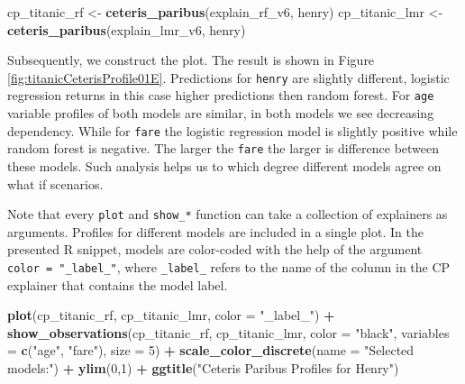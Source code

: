 \documentclass[12pt,]{krantz}
\newenvironment{Shaded}{\begin{snugshade}}{\end{snugshade}}
\newcommand{\DataTypeTok}[1]{\textcolor[rgb]{0.13,0.29,0.53}{#1}}
\newcommand{\DecValTok}[1]{\textcolor[rgb]{0.00,0.00,0.81}{#1}}
\newcommand{\KeywordTok}[1]{\textcolor[rgb]{0.13,0.29,0.53}{\textbf{#1}}}
\newcommand{\NormalTok}[1]{#1}
\newcommand{\OperatorTok}[1]{\textcolor[rgb]{0.81,0.36,0.00}{\textbf{#1}}}
\newcommand{\StringTok}[1]{\textcolor[rgb]{0.31,0.60,0.02}{#1}}
\begin{document}
\begin{Shaded}
\begin{Highlighting}[]
\NormalTok{cp_titanic_rf <-}\StringTok{ }\KeywordTok{ceteris_paribus}\NormalTok{(explain_rf_v6, henry)}
\NormalTok{cp_titanic_lmr <-}\StringTok{ }\KeywordTok{ceteris_paribus}\NormalTok{(explain_lmr_v6, henry)}
\end{Highlighting}
\end{Shaded}

Subsequently, we construct the plot. The result is shown in Figure \ref{fig:titanicCeterisProfile01E}. Predictions for \texttt{henry} are slightly different, logistic regression returns in this case higher predictions then random forest. For \texttt{age} variable profiles of both models are similar, in both models we see decreasing dependency. While for \texttt{fare} the logistic regression model is slightly positive while random forest is negative. The larger the \texttt{fare} the larger is difference between these models. Such analysis helps us to which degree different models agree on what if scenarios.

Note that every \texttt{plot} and \texttt{show\_*} function can take a collection of explainers as arguments. Profiles for different models are included in a single plot. In the presented R snippet, models are color-coded with the help of the argument \texttt{color\ =\ "\_label\_"}, where \texttt{\_label\_} refers to the name of the column in the CP explainer that contains the model label.

\begin{Shaded}
\begin{Highlighting}[]
\KeywordTok{plot}\NormalTok{(cp_titanic_rf, cp_titanic_lmr, }\DataTypeTok{color =} \StringTok{"_label_"}\NormalTok{) }\OperatorTok{+}
\StringTok{  }\KeywordTok{show_observations}\NormalTok{(cp_titanic_rf, cp_titanic_lmr, }\DataTypeTok{color =} \StringTok{"black"}\NormalTok{, }\DataTypeTok{variables =} \KeywordTok{c}\NormalTok{(}\StringTok{"age"}\NormalTok{, }\StringTok{"fare"}\NormalTok{), }\DataTypeTok{size =} \DecValTok{5}\NormalTok{) }\OperatorTok{+}
\StringTok{  }\KeywordTok{scale_color_discrete}\NormalTok{(}\DataTypeTok{name =} \StringTok{"Selected models:"}\NormalTok{) }\OperatorTok{+}\StringTok{ }\KeywordTok{ylim}\NormalTok{(}\DecValTok{0}\NormalTok{,}\DecValTok{1}\NormalTok{) }\OperatorTok{+}\StringTok{ }
\StringTok{  }\KeywordTok{ggtitle}\NormalTok{(}\StringTok{"Ceteris Paribus Profiles for Henry"}\NormalTok{)}
\end{Highlighting}
\end{Shaded}
\end{document}
